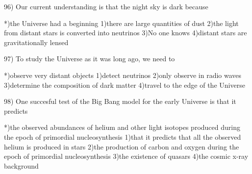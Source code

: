 96) Our current understanding is that the night sky is dark because
 
 *)the Universe had a beginning
 1)there are large quantities of dust
 2)the light from distant stars is converted into neutrinos
 3)No one knows
 4)distant stars are gravitationally lensed
 
97) To study the Universe as it was long ago, we need to
 
 *)observe very distant objects
 1)detect neutrinos
 2)only observe in radio waves
 3)determine the composition of dark matter
 4)travel to the edge of the Universe
 
98) One succesful test of the Big Bang model for the early Universe is
    that it predicts
 
 *)the observed abundances of helium and other light isotopes produced 
   during the epoch of primordial nucleosynthesis
 1)that it predicts that all the observed helium is produced in stars
 2)the production of carbon and oxygen during the epoch of primordial
   nucleosynthesis
 3)the existence of quasars
 4)the cosmic x-ray background
 

